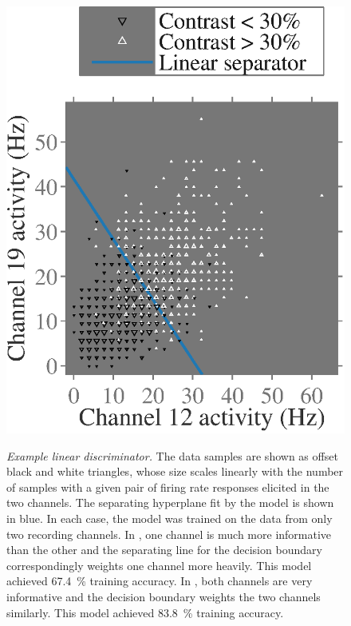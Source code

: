 \begin{figure}[htbp]
{        \includegraphics[scale=.45]{figs/decoding/lindiscrimex_v1_jack_72_3vs8.eps}}
    \hspace*{\fill}
    \caption{%
    \textit{Example linear discriminator.}
    The data samples are shown as offset black and white triangles, whose size scales linearly with the number of samples with a given pair of firing rate responses elicited in the two channels.
    The separating hyperplane fit by the model is shown in blue.
    In each case, the model was trained on the data from only two recording channels.
    In \protect{}, one channel is much more informative than the other and the separating line for the decision boundary correspondingly weights one channel more heavily.
    This model achieved \SI{67.4}{\percent} training accuracy.
    In \protect{}, both channels are very informative and the decision boundary weights the two channels similarly.
    This model achieved \SI{83.8}{\percent} training accuracy.
}
    \label{fig:pl_lin_discrim_example}
\end{figure}


